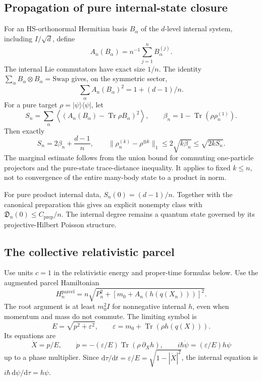 \documentclass[11pt]{article}
\newcommand{\Tr}{\operatorname{Tr}}\newcommand{\dd}{\mathrm d}
\begin{document}
\subsection{Propagation of pure internal-state closure}
For an HS-orthonormal Hermitian basis $B_\alpha$ of the $d$-level internal system, including $I/\sqrt d$, define
\[
A_n(B_\alpha)=n^{-1}\sum_{j=1}^n B_\alpha^{(j)}.
\]
The internal Lie commutators have exact size $1/n$. The identity
$\sum_\alpha B_\alpha\otimes B_\alpha=\mathrm{Swap}$ gives, on the symmetric sector,
\[
\sum_\alpha A_n(B_\alpha)^2=1+(d-1)/n.
\]
For a pure target $\rho=|\psi\rangle\langle\psi|$, let
\[
S_n=\sum_\alpha\left\langle
(A_n(B_\alpha)-\Tr\rho B_\alpha)^2\right\rangle,
\qquad \beta_n=1-\Tr(\rho\rho_n^{(1)}).
\]
Then exactly
\begin{equation}\label{eq:chaos}
\boxed{S_n=2\beta_n+\frac{d-1}{n},\qquad
\|\rho_n^{(k)}-\rho^{\otimes k}\|_1\le2\sqrt{k\beta_n}\le\sqrt{2kS_n}.}
\end{equation}
The marginal estimate follows from the union bound for commuting one-particle projectors and the pure-state trace-distance inequality. It applies to fixed $k\le n$, not to convergence of the entire many-body state to a product in norm.

For pure product internal data, $S_n(0)=(d-1)/n$. Together with the canonical preparation this gives an explicit nonempty class with $\mathfrak D_n(0)\le C_{\mathrm{prep}}/n$. The internal degree remains a quantum state governed by its projective-Hilbert Poisson structure.

\subsection{The collective relativistic parcel}
Use units $c=1$ in the relativistic energy and proper-time formulas below.
Use the augmented parcel Hamiltonian
\begin{equation}\label{eq:parcel}
H_n^{\mathrm{parcel}}
=n\sqrt{P_n^2+\left[m_0+A_n(h(q(X_n)))\right]^2}.
\end{equation}
The root argument is at least $m_0^2I$ for nonnegative internal $h$, even when momentum and mass do not commute. The limiting symbol is
\[
E=\sqrt{p^2+\varepsilon^2},
\qquad \varepsilon=m_0+\Tr(\rho h(q(X))).
\]
Its equations are
\begin{equation}\label{eq:properclock}
\dot X=p/E,\qquad
\dot p=-(\varepsilon/E)\Tr(\rho\,\partial_Xh),\qquad
i\hbar\dot\psi=(\varepsilon/E)h\psi
\end{equation}
up to a phase multiplier. Since $\dd\tau/\dd t=\varepsilon/E=\sqrt{1-|\dot X|^2}$, the internal equation is $i\hbar\,\dd\psi/\dd\tau=h\psi$.
\end{document}
